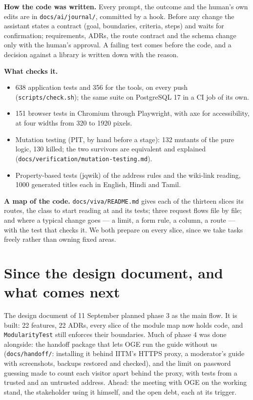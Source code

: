 \documentclass[11pt]{article}
\begin{document}
\textbf{How the code was written.} Every prompt, the outcome and the human's own edits are in
\texttt{docs/ai/journal/}, committed by a hook. Before any change the assistant states a contract
(goal, boundaries, criteria, steps) and waits for confirmation; requirements, ADRs, the route
contract and the schema change only with the human's approval. A failing test comes before the
code, and a decision against a library is written down with the reason.

\textbf{What checks it.}
\begin{itemize}
\item 638 application tests and 356 for the tools, on every push (\texttt{scripts/check.sh}); the
  same suite on PostgreSQL 17 in a CI job of its own.
\item 151 browser tests in Chromium through Playwright, with axe for accessibility, at four widths
  from 320 to 1920 pixels.
\item Mutation testing (PIT, by hand before a stage): 132 mutants of the pure logic, 130 killed; the
  two survivors are equivalent and explained (\texttt{docs/verification/mutation-testing.md}).
\item Property-based tests (jqwik) of the address rules and the wiki-link reading, 1000 generated
  titles each in English, Hindi and Tamil.
\end{itemize}

\textbf{A map of the code.} \texttt{docs/viva/README.md} gives each of the thirteen slices its
routes, the class to start reading at and its tests; three request flows file by file; and where a
typical change goes --- a limit, a form rule, a column, a route --- with the test that checks it. We
both prepare on every slice, since we take tasks freely rather than owning fixed areas.

\section{Since the design document, and what comes next}

The design document of 11 September planned phase 3 as the main flow. It is built: 22 features, 22
ADRs, every slice of the module map now holds code, and \texttt{ModularityTest} still enforces their
boundaries. Much of phase 4 was done alongside: the handoff package that lets OGE run the guide without us
(\texttt{docs/handoff/}: installing it behind IITM's HTTPS proxy, a moderator's guide with
screenshots, backups restored and checked), and the limit on password guessing made to count each
visitor apart behind the proxy, with tests from a trusted and an untrusted address. Ahead: the meeting with OGE on the working stand, the stakeholder using it himself, and
the open debt, each at its trigger.
\end{document}
